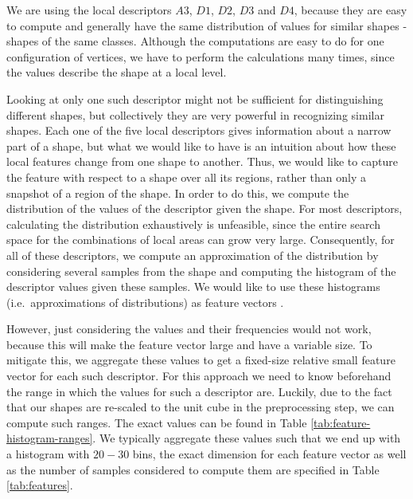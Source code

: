 We are using the local descriptors $A3$, $D1$, $D2$, $D3$ and $D4$, because they are easy to compute and generally have
the same distribution of values for similar shapes - shapes of the same classes.
Although the computations are easy to do for one configuration of vertices, we have to perform the calculations many times, since the values describe the shape at a local level.

Looking at only one such descriptor might not be sufficient for distinguishing different shapes, but collectively they are very powerful in recognizing similar shapes.
Each one of the five local descriptors gives information about a narrow part of a shape, but what we would like to
have is an intuition about how these local features change from one shape to another.
Thus, we would like to capture the feature with respect to a shape over all its regions, rather than only a snapshot
of a region of the shape.
In order to do this, we compute the distribution of the values of the descriptor given the shape.
For most descriptors, calculating the distribution exhaustively is unfeasible, since the entire search space for the
combinations of local areas can grow very large.
Consequently, for all of these descriptors, we compute an approximation of the distribution by considering several
samples from the shape and computing the histogram of the descriptor values given these samples.
We would like to use these histograms (i.e.\ approximations of distributions) as feature vectors .

However, just considering the values and their frequencies would not work, because this will make the feature vector
large and have a variable size.
To mitigate this, we aggregate these values to get a fixed-size relative small feature vector for each such descriptor.
For this approach we need to know beforehand the range in which the values for such a descriptor are.
Luckily, due to the fact that our shapes are re-scaled to the unit cube in the preprocessing step, we can compute
such ranges.
The exact values can be found in Table \ref{tab:feature-histogram-ranges}.
We typically aggregate these values such that we end up with a histogram with $20-30$ bins, the exact dimension for each feature vector as well as the number of samples considered to compute them are specified in Table \ref{tab:features}.

